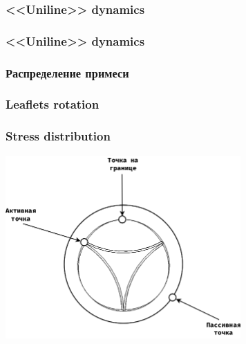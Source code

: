 \documentclass[14pt]{beamer}
\begin{document}

\begin{frame}
\frametitle{<<Uniline>> dynamics}
\end{frame}

\begin{frame}
\frametitle{<<Uniline>> dynamics}
\end{frame}

\begin{frame}
\frametitle{Распределение примеси}
\end{frame}

\begin{frame}
\frametitle{Leaflets rotation}
\end{frame}

\begin{frame}
\frametitle{Stress distribution}
    \begin{center}
        \includegraphics[width=9cm]{valve_points.png}
    \end{center}
\end{frame}
\end{document}
